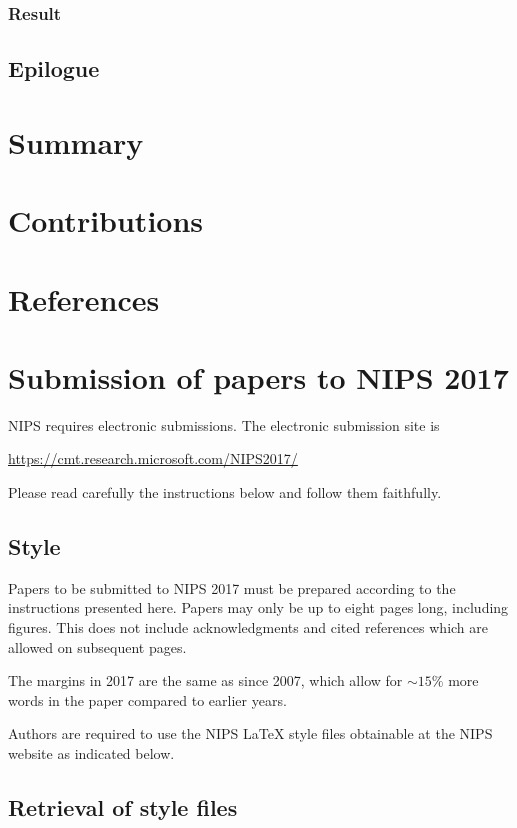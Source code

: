 \documentclass{article}
\begin{document}
\subsubsection{Result}
\subsection{Epilogue}

\section{Summary}

\section{Contributions}

\section{References}

\section{Submission of papers to NIPS 2017}

NIPS requires electronic submissions.  The electronic submission site
is
\begin{center}
  \url{https://cmt.research.microsoft.com/NIPS2017/}
\end{center}

Please read carefully the instructions below and follow them
faithfully.

\subsection{Style}

Papers to be submitted to NIPS 2017 must be prepared according to the
instructions presented here. Papers may only be up to eight pages
long, including figures. This does not include acknowledgments and 
cited references which are allowed on subsequent pages.

The margins in 2017 are the same as since 2007, which allow for
$\sim$$15\%$ more words in the paper compared to earlier years.

Authors are required to use the NIPS \LaTeX{} style files obtainable
at the NIPS website as indicated below. 

\subsection{Retrieval of style files}
\end{document}
